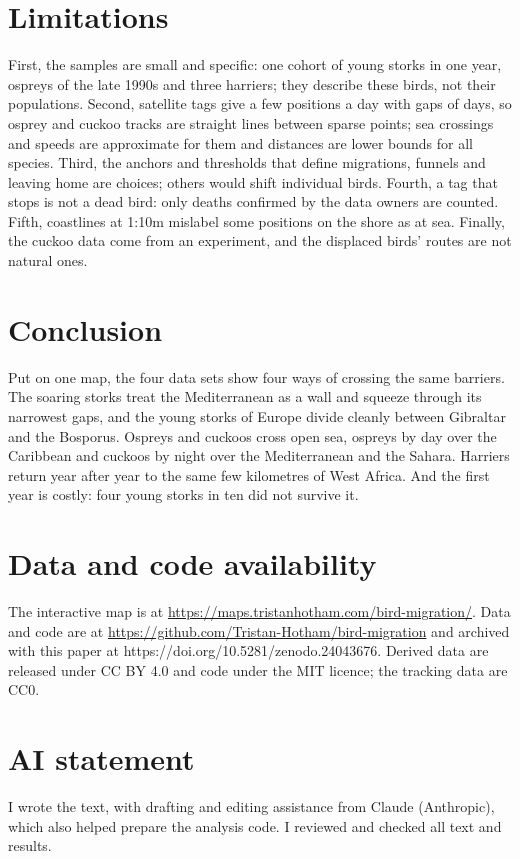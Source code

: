 \documentclass[11pt,a4paper]{article}
\begin{document}
\section{Limitations}
First, the samples are small and specific: one cohort of young storks in one year, ospreys of the late 1990s and three harriers; they describe these birds, not their populations. Second, satellite tags give a few positions a day with gaps of days, so osprey and cuckoo tracks are straight lines between sparse points; sea crossings and speeds are approximate for them and distances are lower bounds for all species. Third, the anchors and thresholds that define migrations, funnels and leaving home are choices; others would shift individual birds. Fourth, a tag that stops is not a dead bird: only deaths confirmed by the data owners are counted. Fifth, coastlines at 1:10m mislabel some positions on the shore as at sea. Finally, the cuckoo data come from an experiment, and the displaced birds' routes are not natural ones.

\section{Conclusion}
Put on one map, the four data sets show four ways of crossing the same barriers. The soaring storks treat the Mediterranean as a wall and squeeze through its narrowest gaps, and the young storks of Europe divide cleanly between Gibraltar and the Bosporus. Ospreys and cuckoos cross open sea, ospreys by day over the Caribbean and cuckoos by night over the Mediterranean and the Sahara. Harriers return year after year to the same few kilometres of West Africa. And the first year is costly: four young storks in ten did not survive it.

\section*{Data and code availability}
The interactive map is at \url{https://maps.tristanhotham.com/bird-migration/}. Data and code are at \url{https://github.com/Tristan-Hotham/bird-migration} and archived with this paper at https://doi.org/10.5281/zenodo.24043676. Derived data are released under CC BY 4.0 and code under the MIT licence; the tracking data are CC0.

\section*{AI statement}
I wrote the text, with drafting and editing assistance from Claude (Anthropic), which also helped prepare the analysis code. I reviewed and checked all text and results.
\end{document}
